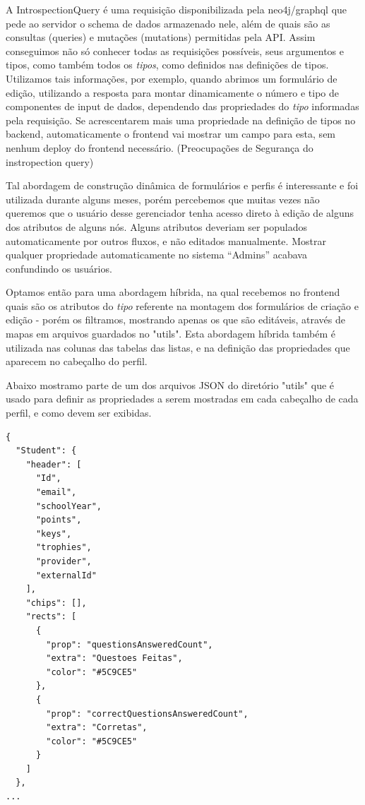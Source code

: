 A IntrospectionQuery é uma requisição disponibilizada pela neo4j/graphql que pede ao servidor o schema de dados armazenado nele, além de quais são as consultas (queries) e mutações (mutations) permitidas pela API. Assim conseguimos não só conhecer todas as requisições possíveis, seus argumentos e tipos, como também todos os \textit{tipos}, como definidos nas definições de tipos. Utilizamos tais informações, por exemplo, quando abrimos um formulário de edição, utilizando a resposta para montar dinamicamente o número e tipo de componentes de input de dados, dependendo das propriedades do \textit{tipo} informadas pela requisição. Se acrescentarem mais uma propriedade na definição de tipos no backend, automaticamente o frontend vai mostrar um campo para esta, sem nenhum deploy do frontend necessário.
(Preocupações de Segurança do instropection query)

Tal abordagem de construção dinâmica de formulários e perfis é interessante e foi utilizada durante alguns meses, porém percebemos que muitas vezes não queremos que o usuário desse gerenciador tenha acesso direto à edição de alguns dos atributos de alguns nós. Alguns atributos deveriam ser populados automaticamente por outros fluxos, e não editados manualmente. Mostrar qualquer propriedade automaticamente no sistema ``Admins'' acabava confundindo os usuários.

Optamos então para uma abordagem híbrida, na qual recebemos no frontend quais são os atributos do \textit{tipo} referente na montagem dos formulários de criação e edição - porém os filtramos, mostrando apenas os que são editáveis, através de mapas em arquivos guardados no "utils". Esta abordagem híbrida também é utilizada nas colunas das tabelas das listas, e na definição das propriedades que aparecem no cabeçalho do perfil.

Abaixo mostramo parte de um dos arquivos JSON do diretório "utils" que é usado para definir as propriedades a serem mostradas em cada cabeçalho de cada perfil, e como devem ser exibidas.
\begin{lstlisting}
{
  "Student": {
    "header": [
      "Id",
      "email",
      "schoolYear",
      "points",
      "keys",
      "trophies",
      "provider",
      "externalId"
    ],
    "chips": [],
    "rects": [
      {
        "prop": "questionsAnsweredCount",
        "extra": "Questoes Feitas",
        "color": "#5C9CE5"
      },
      {
        "prop": "correctQuestionsAnsweredCount",
        "extra": "Corretas",
        "color": "#5C9CE5"
      }
    ]
  },
...
\end{lstlisting}

